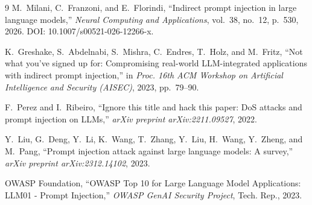 \documentclass[10pt,twocolumn]{article}
\begin{document}
\begin{thebibliography}{9}
\small
{}
M.~Milani, C.~Franzoni, and E.~Florindi, ``Indirect prompt injection in large language models,'' \emph{Neural Computing and Applications}, vol.~38, no.~12, p.~530, 2026. DOI: 10.1007/s00521-026-12266-x.

K.~Greshake, S.~Abdelnabi, S.~Mishra, C.~Endres, T.~Holz, and M.~Fritz, ``Not what you've signed up for: Compromising real-world LLM-integrated applications with indirect prompt injection,'' in \emph{Proc. 16th ACM Workshop on Artificial Intelligence and Security (AISEC)}, 2023, pp.~79--90.

F.~Perez and I.~Ribeiro, ``Ignore this title and hack this paper: DoS attacks and prompt injection on LLMs,'' \emph{arXiv preprint arXiv:2211.09527}, 2022.

Y.~Liu, G.~Deng, Y.~Li, K.~Wang, T.~Zhang, Y.~Liu, H.~Wang, Y.~Zheng, and M.~Pang, ``Prompt injection attack against large language models: A survey,'' \emph{arXiv preprint arXiv:2312.14102}, 2023.

OWASP Foundation, ``OWASP Top 10 for Large Language Model Applications: LLM01 - Prompt Injection,'' \emph{OWASP GenAI Security Project}, Tech. Rep., 2023.
\end{thebibliography}
\end{document}
